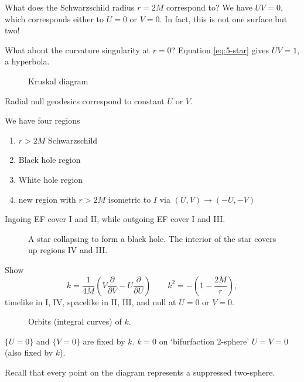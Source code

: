 What does the Schwarzschild radius $r = 2M$ correspond to?
We have  $U V = 0$, which corresponds either to  $U = 0$ or  $V = 0$. In fact, this is not one surface but two!

What about the curvature singularity at  $r = 0$?
Equation  \eqref{eq:5-star} gives $UV = 1$, a hyperbola.
 \begin{figure}[tbhp]
  \centering
  \def\svgwidth{0.4\columnwidth}
  
  \caption{Kruskal diagram}
  \label{fig:l5f2}
\end{figure} 
Radial null geodesics correspond to constant $U$  or $V$.

We have four regions
 \begin{enumerate}[I:]
  \item $r > 2M$ Schwarzschild
  \item Black hole region
  \item White hole region
  \item new region with $r > 2M$ isometric to $I$ via $(U, V) \to (-U, -V)$
\end{enumerate}
\begin{leftbar}
  Ingoing EF cover I and II, while outgoing EF cover I and III.
\end{leftbar}

\begin{figure}[tbhp]
  \centering
  \def\svgwidth{0.4\columnwidth}
  
  \caption{A star collapsing to form a black hole. The interior of the star covers up regions IV and III.}
  \label{fig:l5f3}
\end{figure}

\begin{exercise}
  Show 
  \begin{equation}
    k = \frac{1}{4M} \left( V \frac{\partial }{\partial V} - U \frac{\partial }{\partial U} \right) \qquad k^2 = - \left( 1 - \frac{2M}{r} \right),
  \end{equation} 
  timelike in I, IV, spacelike in II, III, and null at $U = 0$ or $V = 0$.
\end{exercise}

\begin{figure}[tbhp]
  \centering
  \def\svgwidth{0.4\columnwidth}
  
  \caption{Orbits (integral curves) of $k$.}
  \label{fig:l5f3}
\end{figure}

$\{U = 0\}$ and $\{V = 0\}$ are fixed by $k$.
$k = 0$ on `bifurfaction 2-sphere' $U = V = 0$ (also fixed by $k$).
\begin{leftbar}
  Recall that every point on the diagram represents a suppressed two-sphere.
\end{leftbar}
